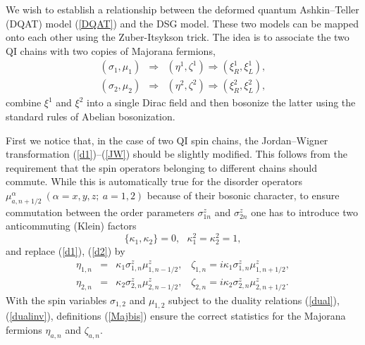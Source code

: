 We wish to establish a relationship between the
deformed quantum Ashkin--Teller (DQAT) model (\ref{DQAT})
and the DSG model. These two models can be mapped onto each other
using the Zuber-Itsykson trick\cite{ZI}.
The idea is to associate the two QI chains with two copies
of Majorana fermions,
\begin{eqnarray}
\left( \sigma_1 , \mu_1 \right) &\Rightarrow& \left( \eta^1, \zeta^1 \right)
\Rightarrow \left( \xi^1 _R , \xi^1 _L \right), \nonumber\\
\left( \sigma_2 , \mu_2 \right) &\Rightarrow& \left( \eta^2, \zeta^2 \right)
\Rightarrow \left( \xi^2 _R , \xi^2 _L \right), \nonumber
\end{eqnarray}
combine $\xi^1$ and $\xi^2$
into a single Dirac field and then bosonize the latter using the standard
rules of Abelian bosonization.

First we notice that, in the case of two QI
spin chains, the Jordan--Wigner transformation (\ref{d1})--(\ref{JW})
should be slightly modified. This follows from
the requirement that the spin operators belonging to different chains
should commute. While this is automatically true for the disorder operators
$\mu^{\alpha}_{a, n+1/2}~(\alpha=x,y,z;~a=1,2)$ because of their
bosonic character, to ensure commutation between
the order parameters
$\sigma^{z}_{1 n}$ and $\sigma^{z}_{2 n}$
one has to introduce two anticommuting (Klein) factors
\begin{equation}
\{ \kappa_1 , \kappa_2 \} = 0, ~~~ \kappa^2 _1 = \kappa^2 _2 = 1,
\label{Klein-algebra}
\end{equation}
and replace (\ref{d1}), (\ref{d2}) by
\begin{eqnarray}
\eta_{1,n}&=&\kappa_1\sigma^z_{1,n}\mu^z_{1,n-1/2},\;\;\;
\zeta_{1,n}=i\kappa_1\sigma^z_{1,n}\mu^z_{1,n+1/2},\nonumber\\
\eta_{2,n}&=&\kappa_2\sigma^z_{2,n}\mu^z_{2,n-1/2},\;\;\;
\zeta_{2,n}=i\kappa_2\sigma^z_{2,n}\mu^z_{2,n+1/2}.
\label{Majbis}
\end{eqnarray}
With the spin variables $\sigma_{1,2}$ and $\mu_{1,2}$ subject to the duality
relations
(\ref{dual}), (\ref{dualinv}),
definitions (\ref{Majbis}) ensure the correct statistics for
the Majorana fermions $\eta_{a,n}$ and $\zeta_{a,n}$.

